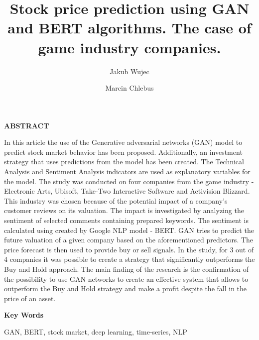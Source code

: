 \documentclass[review]{elsarticle} %
\begin{document}
       
       
\title{Stock price prediction using GAN and BERT algorithms. The case of game industry companies.}

\author[1]{Jakub Wujec}
\author[1]{Marcin Chlebus}


\maketitle

\mbox{}
\vfill


\begin{center}
\textbf{ABSTRACT}
\end{center}

\noindent In this article the use of the Generative adversarial networks (GAN) model to predict stock market behavior has been proposed. Additionally, an investment strategy that uses predictions from the model has been created. The Technical Analysis and Sentiment Analysis indicators are used as explanatory variables for the model. The study was conducted on four companies from the game industry -  Electronic Arts, Ubisoft, Take-Two Interactive Software and Activision Blizzard.  This industry was chosen because of the potential impact of a company's customer reviews on its valuation. The impact is investigated by analyzing the sentiment of selected comments containing prepared keywords. The sentiment is calculated using created by Google NLP model - BERT. GAN tries to predict the future valuation of a given company based on the aforementioned predictors. The price forecast is then used to provide buy or sell signals. In the study, for 3 out of 4 companies it was possible to create a strategy that significantly outperforms the Buy and Hold approach. The main finding of the research is the confirmation of the possibility to use GAN networks to create an effective system that allows to outperform the Buy and Hold strategy and make a profit despite the fall in the price of an asset.

\vspace{\baselineskip}

\begin{center}
\textbf{Key Words}

GAN, BERT, stock market, deep learning, time-series, NLP
\end{center}
\end{document}
